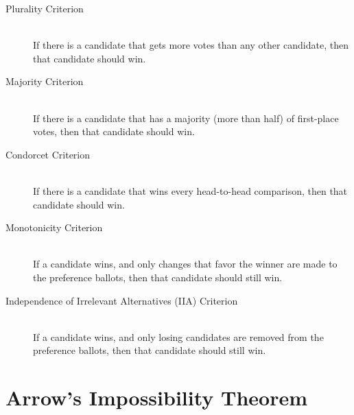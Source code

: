 \begin{description}
\item[Plurality Criterion] \hfill \\
  If there is a candidate that gets more votes than any other
  candidate, then that candidate should win.
\item[Majority Criterion] \hfill \\
  If there is a candidate that has a majority (more than half) of
  first-place votes, then that candidate should win.
\item[Condorcet Criterion] \hfill \\
  If there is a candidate that wins every head-to-head comparison,
  then that candidate should win.
\item[Monotonicity Criterion] \hfill \\
  If a candidate wins, and only changes that favor the winner are made
  to the preference ballots, then that candidate should still win.
\item[Independence of Irrelevant Alternatives (IIA) Criterion] \hfill \\
  If a candidate wins, and only losing candidates are removed from the
  preference ballots, then that candidate should still win.
\end{description}


\section{Arrow's Impossibility Theorem}%
\label{sec:arrows-impossibility-thm}





